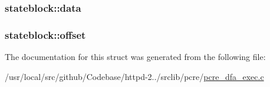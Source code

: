 \subsubsection[{\texorpdfstring{data}{data}}]{ stateblock\+::data}\hypertarget{structstateblock_aeca60671b6cc7190b41339eb26d11d0d}{}\label{structstateblock_aeca60671b6cc7190b41339eb26d11d0d}
\subsubsection[{\texorpdfstring{offset}{offset}}]{ stateblock\+::offset}\hypertarget{structstateblock_a2228be0a36fca3a248a81967b90b4e32}{}\label{structstateblock_a2228be0a36fca3a248a81967b90b4e32}


The documentation for this struct was generated from the following file\+:\begin{DoxyCompactItemize}
\item 
/usr/local/src/github/\+Codebase/httpd-\/2../srclib/pcre/\hyperlink{pcre__dfa__exec_8c}{pcre\+\_\+dfa\+\_\+exec.\+c}\end{DoxyCompactItemize}
